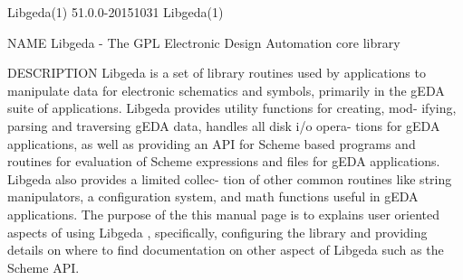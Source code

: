 Libgeda(1)                      51.0.0-20151031                     Libgeda(1)



NAME
       Libgeda - The GPL Electronic Design Automation core library

DESCRIPTION
       Libgeda is a set of library routines used by applications to manipulate
       data for electronic schematics and symbols, primarily in the gEDA suite
       of applications.  Libgeda provides utility functions for creating, mod-
       ifying, parsing and traversing gEDA data, handles all disk  i/o  opera-
       tions  for  gEDA  applications,  as well as providing an API for Scheme
       based programs and routines for evaluation of  Scheme  expressions  and
       files  for  gEDA applications.  Libgeda also provides a limited collec-
       tion of other common routines like string manipulators, a configuration
       system,  and math functions useful in gEDA applications. The purpose of
       the this manual page is to explains  user  oriented  aspects  of  using
       Libgeda  ,  specifically, configuring the library and providing details
       on where to find documentation on other aspect of Libgeda such  as  the
       Scheme API.

